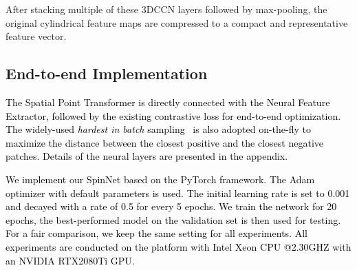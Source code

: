 \documentclass[final]{cvpr}
\newcommand{\qy}[1]{\textcolor{black}{#1}}
\newcommand{\nickname}{SpinNet}
\begin{document}
After stacking multiple of these 3DCCN layers followed by max-pooling, the original cylindrical feature maps are compressed to a compact and representative feature vector.

\begin{comment}
\qy{As shown in Figure~\ref{fig: 3DCCN}, the 3D cylindrical space is defined as , we then formulate the 3D cylindrical feature maps and filters as continuous functions , where ,  and  represent the radial distance to the center, height, and azimuth angle of cylindrical signal respectively.  is the number of channels. Formally, 3D cylindrical convolution takes the cylinder signal  as input and convolves it with the filter :}

\end{comment}

 
\subsection{End-to-end Implementation}
\label{subsec: network}
\qy{ The Spatial Point Transformer is directly connected with the Neural Feature Extractor, followed by the existing contrastive loss \cite{bai2020d3feat} for end-to-end optimization. The widely-used \textit{hardest in batch} sampling~\cite{mishchuk2017working} is also adopted on-the-fly to maximize the distance between the closest positive and the closest negative patches. Details of the neural layers are presented in the appendix.}

\qy{We implement our \nickname{} based on the PyTorch framework. The Adam optimizer \cite{kingma2014adam} with default parameters is used. The initial learning rate is set to 0.001 and decayed with a rate of 0.5 for every 5 epochs. We train the network for 20 epochs, the best-performed model on the validation set is then used for testing. For a fair comparison, we keep the same setting for all experiments. All experiments are conducted on the platform with Intel Xeon CPU @2.30GHZ with an NVIDIA RTX2080Ti GPU.}



\begin{comment}
{\bf Architecture.} 
\qy{We stack several cylindrical convolutional layers together to learn a more descriptive feature representation with SO(2) rotation-equivariance. In addition, we follow R2D2~\cite{Revaud2019} to stack three 22 cylindrical convolution layers together to reduce the parameters and computational cost. The last feature maps are further aggregated using a non-parametric max-pooling layer, and the final output is a rotation-invariant and compact (32-dim) local feature descriptor. To avoid overfitting, the whole framework is lightweight with a small number of trainable parameters (about 2 million), which is far fewer than FCGF \cite{choy2019fully} and D3Feat \cite{bai2020d3feat}. For the detailed network architecture, please refer to the supplementary materials.}
\end{comment} 
\end{document}
